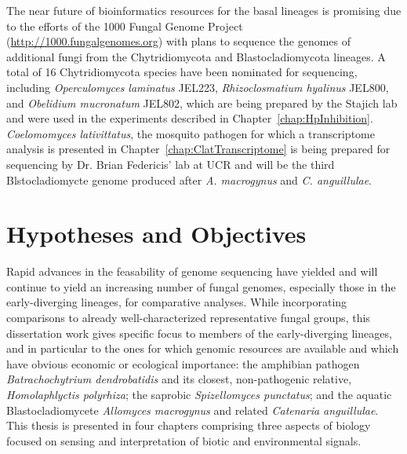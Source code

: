 \indent The near future of bioinformatics resources for the basal
lineages is promising due to the efforts of the 1000 Fungal Genome
Project (\url{http://1000.fungalgenomes.org}) with plans to sequence the 
genomes of additional fungi from the Chytridiomycota and Blastocladiomycota 
lineages. A total of 16 Chytridiomycota species have been nominated for 
sequencing, including \textit{Operculomyces laminatus} JEL223, 
\textit{Rhizoclosmatium hyalinus} JEL800, and \textit{Obelidium mucronatum} JEL802, 
which are being prepared by the Stajich lab and were used in the experiments 
described in Chapter~\ref{chap:HpInhibition}. \textit{Coelomomyces lativittatus}, 
the mosquito pathogen for which a transcriptome analysis is presented in 
Chapter~\ref{chap:ClatTranscriptome} is being prepared for sequencing by 
Dr. Brian Federicis' lab at UCR and will be the third Blstocladiomycte genome
produced after \textit{A. macrogynus} and \textit{C. anguillulae}.\\

\section{Hypotheses and Objectives}
\indent Rapid advances in the feasability of genome sequencing have
yielded and will continue to yield an increasing number of fungal
genomes, especially those in the early-diverging lineages, for
comparative analyses. While incorporating comparisons to already
well-characterized representative fungal groups, this dissertation
work gives specific focus to members of the early-diverging lineages,
and in particular to the ones for which genomic resources are
available and which have obvious economic or ecological importance:
the amphibian pathogen \textit{Batrachochytrium dendrobatidis} and its
closest, non-pathogenic relative, \textit{Homolaphlyctis polyrhiza};
the saprobic \textit{Spizellomyces punctatus}; and the aquatic
Blastocladiomycete \textit{Allomyces macrogynus} and related
\textit{Catenaria anguillulae}. This thesis is presented in four
chapters comprising three aspects of biology focused on sensing and
interpretation of biotic and environmental signals.\\
